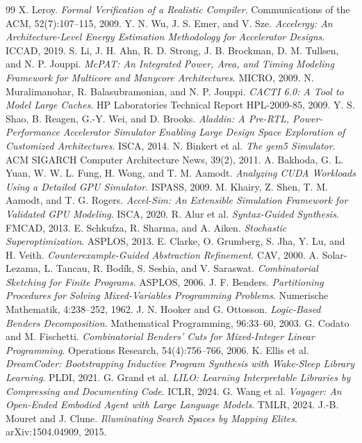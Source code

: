 \documentclass[11pt]{article}
\begin{document}
\begin{thebibliography}{99}
 X. Leroy. \emph{Formal Verification of a Realistic Compiler}. Communications of the ACM, 52(7):107--115, 2009.
 Y. N. Wu, J. S. Emer, and V. Sze. \emph{Accelergy: An Architecture-Level Energy Estimation Methodology for Accelerator Designs}. ICCAD, 2019.
 S. Li, J. H. Ahn, R. D. Strong, J. B. Brockman, D. M. Tullsen, and N. P. Jouppi. \emph{McPAT: An Integrated Power, Area, and Timing Modeling Framework for Multicore and Manycore Architectures}. MICRO, 2009.
 N. Muralimanohar, R. Balasubramonian, and N. P. Jouppi. \emph{CACTI 6.0: A Tool to Model Large Caches}. HP Laboratories Technical Report HPL-2009-85, 2009.
 Y. S. Shao, B. Reagen, G.-Y. Wei, and D. Brooks. \emph{Aladdin: A Pre-RTL, Power-Performance Accelerator Simulator Enabling Large Design Space Exploration of Customized Architectures}. ISCA, 2014.
 N. Binkert et al. \emph{The gem5 Simulator}. ACM SIGARCH Computer Architecture News, 39(2), 2011.
 A. Bakhoda, G. L. Yuan, W. W. L. Fung, H. Wong, and T. M. Aamodt. \emph{Analyzing CUDA Workloads Using a Detailed GPU Simulator}. ISPASS, 2009.
 M. Khairy, Z. Shen, T. M. Aamodt, and T. G. Rogers. \emph{Accel-Sim: An Extensible Simulation Framework for Validated GPU Modeling}. ISCA, 2020.
 R. Alur et al. \emph{Syntax-Guided Synthesis}. FMCAD, 2013.
 E. Schkufza, R. Sharma, and A. Aiken. \emph{Stochastic Superoptimization}. ASPLOS, 2013.
 E. Clarke, O. Grumberg, S. Jha, Y. Lu, and H. Veith. \emph{Counterexample-Guided Abstraction Refinement}. CAV, 2000.
 A. Solar-Lezama, L. Tancau, R. Bodík, S. Seshia, and V. Saraswat. \emph{Combinatorial Sketching for Finite Programs}. ASPLOS, 2006.
 J. F. Benders. \emph{Partitioning Procedures for Solving Mixed-Variables Programming Problems}. Numerische Mathematik, 4:238--252, 1962.
 J. N. Hooker and G. Ottosson. \emph{Logic-Based Benders Decomposition}. Mathematical Programming, 96:33--60, 2003.
 G. Codato and M. Fischetti. \emph{Combinatorial Benders' Cuts for Mixed-Integer Linear Programming}. Operations Research, 54(4):756--766, 2006.
 K. Ellis et al. \emph{DreamCoder: Bootstrapping Inductive Program Synthesis with Wake-Sleep Library Learning}. PLDI, 2021.
 G. Grand et al. \emph{LILO: Learning Interpretable Libraries by Compressing and Documenting Code}. ICLR, 2024.
 G. Wang et al. \emph{Voyager: An Open-Ended Embodied Agent with Large Language Models}. TMLR, 2024.
 J.-B. Mouret and J. Clune. \emph{Illuminating Search Spaces by Mapping Elites}. arXiv:1504.04909, 2015.

\end{thebibliography}
\end{document}
